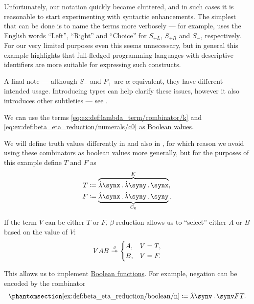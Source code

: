 \begin{example}
\begin{thmenum}
    Unfortunately, our notation quickly became cluttered, and in such cases it is reasonable to start experimenting with syntactic enhancements. The simplest that can be done is to name the terms more verbosely --- for example, \cite{MathOF:product_type_in_simply_typed_lambda_terms} uses the English words \enquote{Left}, \enquote{Right} and \enquote{Choice} for \( S_{+L} \), \( S_{+R} \) and \( S_- \), respectively. For our very limited purposes even this seems unnecessary, but in general this example highlights that full-fledged programming languages with descriptive identifiers are more suitable for expressing such constructs.

    A final note --- although \( S_- \) and \( P_+ \) are \( \alpha \)-equivalent, they have different intended usage. Introducing types can help clarify these issues, however it also introduces other subtleties --- see .

     We can use the terms \ref{eq:ex:def:lambda_term/combinator/k} and \ref{eq:ex:def:beta_eta_reduction/numerals/c0} as \hyperref[con:boolean_value]{Boolean values}.

    We will define truth values differently in  and also in , for which reason we avoid using these combinators as boolean values more generally, but for the purposes of this example define \( T \) and \( F \) as
    \begin{align*}
      T &\coloneqq \overbrace{\qabs \synx \qabs \syny \synx}^K, \\
      F &\coloneqq \underbrace{\qabs \synx \qabs \syny \syny}_{C_0}.
    \end{align*}

    If the term \( V \) can be either \( T \) or \( F \), \( \beta \)-reduction allows us to \enquote{select} either \( A \) or \( B \) based on the value of \( V \):
    \begin{equation}\label{ex:def:beta_eta_reduction/boolean/if}
      VAB \bred* \begin{cases}
        A, &V = T, \\
        B, &V = F.
      \end{cases}
    \end{equation}

    This allows us to implement \hyperref[def:boolean_function]{Boolean functions}. For example, negation can be encoded by the combinator
    \begin{equation*}\taglabel[N]{ex:def:beta_eta_reduction/boolean/n}
      \ref{ex:def:beta_eta_reduction/boolean/n} \coloneqq \qabs \synv \synv F T.
    \end{equation*}


\end{thmenum}
\end{example}
